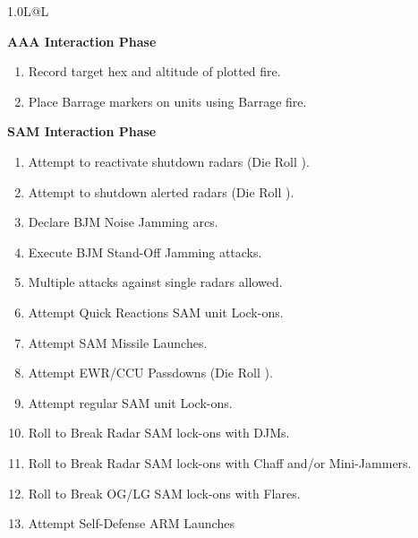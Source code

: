 
\begin{twocolumntablefloat}
\begin{twocolumntable}
\scriptsize

\newcommand{\sopphase}[1]{\smallskip\textbf{#1}\par\smallskip}

\begin{tabularx}{1.0\linewidth}{L@{\hspace{\columnsep}}L}
\toprule

\sopphase{AAA Interaction Phase}

\begin{enumerate}[nosep]
    \item Record target hex and altitude of plotted fire.
    \item Place Barrage markers on units using Barrage fire.
\end{enumerate}

\sopphase{SAM Interaction Phase}

\begin{enumerate}[nosep]
    \item Attempt to reactivate shutdown radars (Die Roll ).
    \item Attempt to shutdown alerted radars (Die Roll ).
    \item Declare BJM Noise Jamming arcs.
    \item Execute BJM Stand-Off Jamming attacks.
    \item[--] Multiple attacks against single radars allowed.
    \item Attempt Quick Reactions SAM unit Lock-ons.
    \item Attempt SAM Missile Launches.
    \item Attempt EWR/CCU Passdowns (Die Roll ).
    \item Attempt regular SAM unit Lock-ons.
    \item Roll to Break Radar SAM lock-ons with DJMs.
    \item Roll to Break Radar SAM lock-ons with Chaff and/or Mini-Jammers.
    \item Roll to Break OG/LG SAM lock-ons with Flares.
    \item Attempt Self-Defense ARM Launches
\end{enumerate}


\end{tabularx}
\end{twocolumntable}
\end{twocolumntablefloat}
